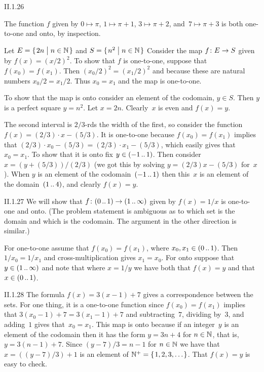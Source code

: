 %
\begin{ans}{II.1.26}
\begin{exparts}
\item The function $f$ given by
  $0\mapsto\pi$, $1\mapsto\pi+1$, $3\mapsto\pi+2$, and~$7\mapsto\pi+3$
  is both one-to-one and onto, by inspection.
\item Let $E=\set{2n\suchthat n\in\N}$ and
  $S=\set{n^2\suchthat n\in\N}$
  Consider the map $\mbox{$f\colon E\to S$}$ given by $f(x)=(x/2)^2$.
  To show that $f$ is one-to-one, suppose that $f(x_0)=f(x_1)$.
  Then $(x_0/2)^2=(x_1/2)^2$ and because these are natural numbers
  $x_0/2=x_1/2$.
  Thus $x_0=x_1$ and the map is one-to-one.

  To show that the map is onto consider an element of the codomain,
  $y\in S$.
  Then $y$ is a perfect square $y=n^2$.
  Let $x=2n$.
  Clearly~$x$ is even and $f(x)=y$.
\item The second interval is $2/3$-rds the width of the first,
  so consider the function $f(x)=(2/3)\cdot x-(5/3)$.
  It is one-to-one because $f(x_0)=f(x_1)$ implies that
  $(2/3)\cdot x_0-(5/3)=(2/3)\cdot x_1-(5/3)$, which easily gives
  that $x_0=x_1$.
  To show that it is onto fix $y\in(-1\mathinner{{\ldotp}{\ldotp}} 1)$.
  Then consider $x=(y+(5/3))/(2/3)$ (we got this by solving $y=(2/3)x-(5/3)$
  for~$x$).
  When $y$ is an element of the codomain~$(-1\mathinner{{\ldotp}{\ldotp}} 1)$ then this~$x$
  is an element of the domain~$(1\mathinner{{\ldotp}{\ldotp}} 4)$,
  and clearly $f(x)=y$.
\end{exparts}
\end{ans}
%
\begin{ans}{II.1.27}
We will show that $\mbox{$f\colon (0\mathinner{{\ldotp}{\ldotp}} 1)\to (1\mathinner{{\ldotp}{\ldotp}} \infty)$}$
given by $f(x)=1/x$ is one-to-one and onto.
(The problem statement is ambiguous as to which set is the domain and
which is the codomain.
The argument in the other direction is similar.)

For one-to-one assume that $f(x_0)=f(x_1)$, where $x_0,x_1\in(0\mathinner{{\ldotp}{\ldotp}} 1)$.
Then $1/x_0=1/x_1$ and cross-multiplication gives $x_1=x_0$.
For onto suppose that $y\in(1\mathinner{{\ldotp}{\ldotp}} \infty)$ and note that where
$x=1/y$ we have both that $f(x)=y$ and that $x\in(0\mathinner{{\ldotp}{\ldotp}} 1)$.
\end{ans}
%
\begin{ans}{II.1.28}
The formula $f(x)=3(x-1)+7$ gives a correspondence between the sets.
For one thing, it is a one-to-one function since $f(x_0)=f(x_1)$ implies
that $3(x_0-1)+7=3(x_1-1)+7$ and subtracting~$7$, dividing by~$3$, and
adding~$1$ gives that~$x_0=x_1$.
This map is onto because if an integer~$y$ is an element of the codomain
then it has the form $y=3n+4$ for $n\in\mathbb{N}$, that is, $y=3(n-1)+7$.
Since $(y-7)/3=n-1$ for $n\in\mathbb{N}$ we have that
$x=((y-7)/3)+1$ is an element of $\N^+=\set{1,2,3,\ldots}$.
That $f(x)=y$ is easy to check.
\end{ans}
